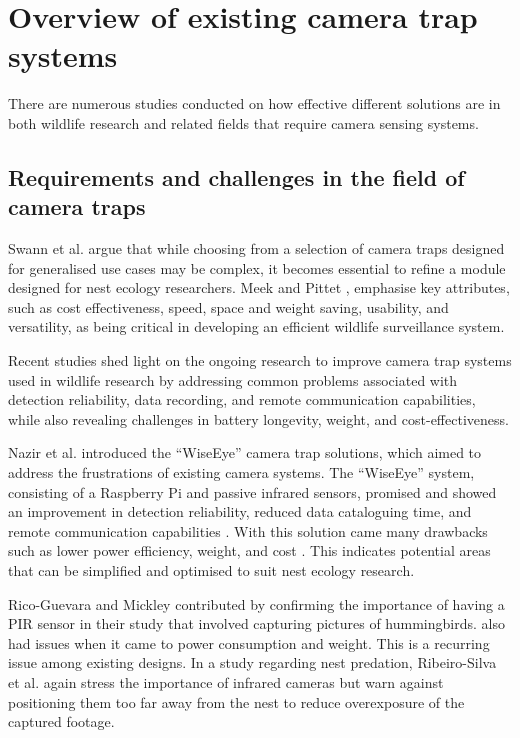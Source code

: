 \documentclass[class=report,11pt,crop=false]{standalone}
\begin{document}
\section{Overview of existing camera trap systems}

There are numerous studies conducted on how effective different solutions are in both wildlife research and related fields that require camera sensing systems. 

\subsection{Requirements and challenges in the field of camera traps}

Swann et al. \cite{swann2011evaluating} argue that while choosing from a selection of camera traps designed for generalised use cases may be complex, it becomes essential to refine a module designed for nest ecology researchers. Meek and Pittet \cite{meek2012user}, emphasise key attributes, such as cost effectiveness, speed, space and weight saving, usability, and versatility, as being critical in developing an efficient wildlife surveillance system.  

Recent studies shed light on the ongoing research to improve camera trap systems used in wildlife research by addressing common problems associated with detection reliability, data recording, and remote communication capabilities, while also revealing challenges in battery longevity, weight, and cost-effectiveness. 

Nazir et al. \cite{nazir2017wiseeye} introduced the “WiseEye” camera trap solutions, which aimed to address the frustrations of existing camera systems. The “WiseEye” system, consisting of a Raspberry Pi and passive infrared sensors, promised and showed an improvement in detection reliability, reduced data cataloguing time, and remote communication capabilities \cite{nazir2017wiseeye}. With this solution came many drawbacks such as lower power efficiency, weight, and cost \cite{nazir2017wiseeye}. This indicates potential areas that can be simplified and optimised to suit nest ecology research.  

Rico-Guevara and Mickley \cite{rico-guevara2017bring} contributed by confirming the importance of having a PIR sensor in their study that involved capturing pictures of hummingbirds. \cite{rico-guevara2017bring} also had issues when it came to power consumption and weight. This is a recurring issue among existing designs. In a study regarding nest predation, Ribeiro-Silva et al. \cite{ribeiro-silva2018testing} again stress the importance of infrared cameras but warn against positioning them too far away from the nest to reduce overexposure of the captured footage.
\end{document}
